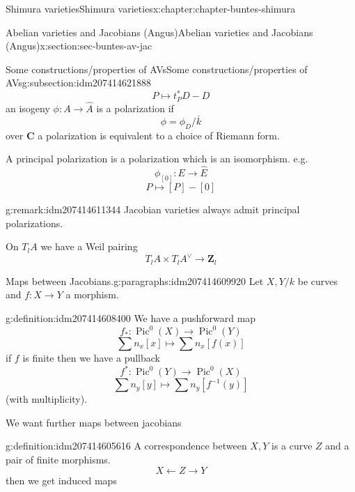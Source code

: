 \documentclass[oneside,10pt,]{book}
\numberwithin{equation}{section}
\newcommand{\inv}{^{-1}}
\newcommand{\ZZ}{\mathbf{Z}}
\newcommand{\CC}{\mathbf{C}}
\DeclareMathOperator{\Pic}{Pic}
\begin{document}
\begin{chapterptx}{Shimura varieties}{}{Shimura varieties}{}{}{x:chapter:chapter-buntes-shimura}
\begin{sectionptx}{Abelian varieties and Jacobians (Angus)}{}{Abelian varieties and Jacobians (Angus)}{}{}{x:section:sec-buntes-av-jac}
\begin{subsectionptx}{Some constructions\slash{}properties of AVs}{}{Some constructions\slash{}properties of AVs}{}{}{g:subsection:idm207414621888}
%
\begin{equation*}
P \mapsto t_P^* D -D
\end{equation*}
an isogeny \(\phi\colon A\to \hat A\) is a polarization if%
\begin{equation*}
\phi =  \phi_D /\bar k
\end{equation*}
over \(\CC\)  a polarization is equivalent to a choice of Riemann form.%
\par
A principal polarization is a polarization which is an isomorphism. e.g.%
\begin{equation*}
\phi_{[0]} \colon E \to \hat E
\end{equation*}
%
\begin{equation*}
P \mapsto [P] - [0]
\end{equation*}
%
\begin{remark}{}{g:remark:idm207414611344}%
Jacobian varieties always admit principal polarizations.%
\end{remark}
On \(T_lA \) we have  a Weil pairing%
\begin{equation*}
T_lA \times T_lA^\vee \to \ZZ_l
\end{equation*}
%
\begin{paragraphs}{Maps between Jacobians.}{g:paragraphs:idm207414609920}%
Let \(X,Y/k\) be curves and \(f\colon X \to Y\) a morphism.%
\begin{definition}{}{g:definition:idm207414608400}%
We have a pushforward map%
\begin{equation*}
f_*\colon \Pic^0(X) \to \Pic^0(Y)
\end{equation*}
%
\begin{equation*}
\sum n_x [x] \mapsto \sum n_x[f(x)]
\end{equation*}
if \(f\) is finite then we have  a pullback%
\begin{equation*}
f^* \colon \Pic^0(Y) \to \Pic^0(X)
\end{equation*}
%
\begin{equation*}
\sum n_y[y] \mapsto \sum n_y [f\inv (y)]
\end{equation*}
(with multiplicity).%
\end{definition}
We want further maps between jacobians%
\begin{definition}{}{g:definition:idm207414605616}%
A correspondence between \(X,Y\) is a curve \(Z\) and a pair of finite morphisms.%
\begin{equation*}
X \leftarrow Z \to Y
\end{equation*}
then we get induced maps%
\begin{equation*}

\end{equation*}
\end{definition}
\end{paragraphs}
\end{subsectionptx}
\end{sectionptx}
\end{chapterptx}
\end{document}

